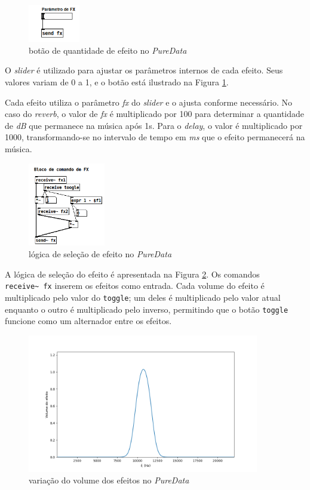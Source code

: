 \begin{figure}[h]
    \centering
    \includegraphics[width=0.2\textwidth]{figuras/fig47.png}
    \caption{botão de quantidade de efeito no \textit{PureData}}
    \label{fig47}
\end{figure}

O \textit{slider} é utilizado para ajustar os parâmetros internos de cada efeito. Seus valores variam de 0 a 1, e o botão está ilustrado na Figura \ref{fig47}.

Cada efeito utiliza o parâmetro \textit{fx} do \textit{slider} e o ajusta conforme necessário. No caso do \textit{reverb}, o valor de \textit{fx} é multiplicado por 100 para determinar a quantidade de \textit{dB} que permanece na música após 1s. Para o \textit{delay}, o valor é multiplicado por 1000, transformando-se no intervalo de tempo em \textit{ms} que o efeito permanecerá na música.

\begin{figure}[h]
    \centering
    \includegraphics[width=0.3\textwidth]{figuras/fig48.png}
    \caption{lógica de seleção de efeito no \textit{PureData}}
    \label{fig48}
\end{figure}

A lógica de seleção do efeito é apresentada na Figura \ref{fig48}. Os comandos \texttt{receive\textasciitilde\ fx} inserem os efeitos como entrada. Cada volume do efeito é multiplicado pelo valor do \texttt{toggle}; um deles é multiplicado pelo valor atual enquanto o outro é multiplicado pelo inverso, permitindo que o botão \texttt{toggle} funcione como um alternador entre os efeitos.


\begin{figure}[h]
    \centering
    \includegraphics[width=0.9\textwidth]{figuras/fig49.png}
    \caption{variação do volume dos efeitos no \textit{PureData}}
    \label{fig49}
\end{figure}

